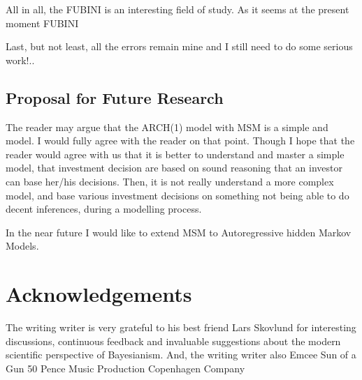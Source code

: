 \documentclass[a4paper,11pt,english]{article}
\begin{document}
	All in all, the FUBINI is an interesting field of study. As it seems at the present moment FUBINI	\vskip 0.3cm

	Last, but not least, all the errors remain mine and I still need to do some serious work!.. 
		

		\subsection{Proposal for Future Research}

		The reader may argue that the ARCH(1) model with MSM is a simple and model. I would fully agree with the reader on that point. Though I hope that
		the reader would agree with us that it is better to understand and master a simple model, that investment decision are based on sound reasoning 
		that an investor can base her/his decisions. Then, it is  not really understand a more complex model, and base various investment decisions on 
		something not being able to do decent inferences, during a modelling process.
		
		In the near future I would like to extend MSM to Autoregressive hidden Markov Models.
			

	
	
	\section{Acknowledgements}		
	
	The writing writer is very grateful to his best friend Lars Skovlund for interesting discussions, continuous feedback and invaluable suggestions 
	about the modern scientific perspective of Bayesianism. 
	And, the writing writer also Emcee Sun of a Gun 50 Pence Music Production Copenhagen Company	



		
\end{document}
